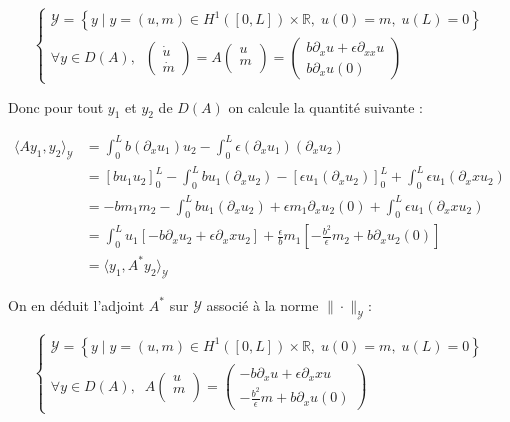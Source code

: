\documentclass[a4paper]{article}
\newcommand{\dep}{b}
\begin{document}
\begin{equation}
	\begin{cases}
		\mathscr{Y} = \left\{ y \; | \; y = (u,m) \in H^1([0,L])\times \mathbb{R},
 \; u(0)=m, \; u(L)=0 \right\} \\
        \forall y \in D(A), \; \;
		\left( \begin{array}{c}
		\dot{u}\\
		\dot{m}
		\end{array} \right)
		= A \left( \begin{array}{c}
		u\\
		m\\
		\end{array} \right) 
		= \left(\begin{array}{c}
		\dep \partial_x u + \epsilon \partial_{xx} u\\
		\dep \partial_x u(0)
		\end{array}\right)
	\end{cases}
\end{equation}

Donc pour tout $y_1$ et $y_2$ de $D(A)$ on calcule la quantité suivante :

\[ \begin{split}
\langle Ay_1,y_2 \rangle_{\mathscr{Y}} &= \int_0^L \dep (\partial_x u_1)u_2
                                     - \int_0^L \epsilon (\partial_x u_1)(\partial_x u_2)\\
					&= [\dep u_1u_2]_0^L
						- \int_0^L \dep u_1(\partial_x u_2)
						-[\epsilon u_1 (\partial_x u_2)]_0^L
						+ \int_0^L \epsilon u_1(\partial_xx u_2)\\
					&= -\dep m_1m_2
						- \int_0^L \dep u_1(\partial_x u_2)
						+\epsilon m_1 \partial_x u_2(0)
						+ \int_0^L \epsilon u_1(\partial_xx u_2)\\
					&= \int_0^L u_1 [- \dep \partial_x u_2 + \epsilon \partial_xx u_2]
						+ \displaystyle \frac{\epsilon}{\dep} m_1 
						[-\frac{\dep^2}{\epsilon} m_2 + \dep \partial_x u_2(0)]\\
					&= \langle y_1, A^* y_2 \rangle_{\mathscr{Y}}
\end{split} \]

On en déduit l'adjoint $A^*$ sur $\mathscr{Y}$ associé à la norme $\| \cdot \|_{\mathscr{Y}}$:

\begin{equation}
	\begin{cases}
		\mathscr{Y} = \left\{ y \; | \; y = (u,m) \in H^1([0,L])\times \mathbb{R},
 \; u(0)=m, \; u(L)=0 \right\} \\
        \forall y \in D(A), \; \;
	A \left( \begin{array}{c}
		u\\
		m\\
		\end{array} \right) 
		= \left(\begin{array}{c}
		- \dep \partial_x u + \epsilon \partial_xx u\\
		-\displaystyle \frac{\dep^2}{\epsilon} m + \dep \partial_x u(0)
		\end{array}\right)
	\end{cases}
\end{equation}
\end{document}
